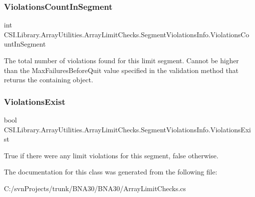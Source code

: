\subsubsection{\texorpdfstring{ViolationsCountInSegment}{ViolationsCountInSegment}}
{\footnotesize\ttfamily int C\+S\+I.\+Library.\+Array\+Utilities.\+Array\+Limit\+Checks.\+Segment\+Violations\+Info.\+Violations\+Count\+In\+Segment\hspace{0.3cm}{\ttfamily [get]}}



The total number of violations found for this limit segment. Cannot be higher than the Max\+Failures\+Before\+Quit value specified in the validation method that returns the containing object. 

\mbox{\label{class_c_s_i_1_1_library_1_1_array_utilities_1_1_array_limit_checks_1_1_segment_violations_info_abe3392755fff9d162f27757e4c3b552c}} 
\subsubsection{\texorpdfstring{ViolationsExist}{ViolationsExist}}
{\footnotesize\ttfamily bool C\+S\+I.\+Library.\+Array\+Utilities.\+Array\+Limit\+Checks.\+Segment\+Violations\+Info.\+Violations\+Exist\hspace{0.3cm}{\ttfamily [get]}}



True if there were any limit violations for this segment, false otherwise. 



The documentation for this class was generated from the following file\+:\begin{DoxyCompactItemize}
\item 
C\+:/svn\+Projects/trunk/\+B\+N\+A30/\+B\+N\+A30/Array\+Limit\+Checks.\+cs\end{DoxyCompactItemize}
